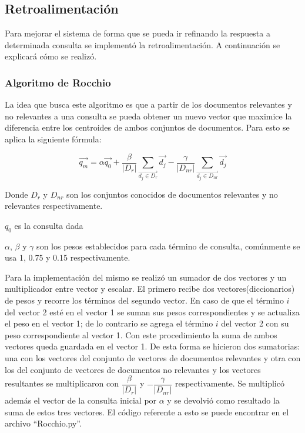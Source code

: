 \documentclass[runningheads]{llncs}
\begin{document}
	\subsection{Retroalimentación}
	Para mejorar el sistema de forma que se pueda ir refinando la respuesta a determinada consulta se implement\'o la retroalimentaci\'on. A continuaci\'on se explicar\'a c\'omo se realiz\'o.
	
	\subsubsection{Algoritmo de Rocchio}
	La idea que busca este algoritmo es que a partir de los documentos relevantes y no relevantes a una consulta se pueda obtener un nuevo vector que maximice la diferencia entre los centroides de ambos conjuntos de documentos.
	Para esto se aplica la siguiente f\'ormula:
	
	$$
	\vec{q_{m}}= \alpha \vec{q_{0}}+\dfrac{\beta}{|D_{r}|}\sum_{\vec{d_{j} \in D_{r}}} \vec{d_{j}} -\dfrac{\gamma}{|D_{nr}|}\sum_{\vec{d_{j} \in D_{nr}}} \vec{d_{j}}
	$$
	
	Donde $ D_{r} $ y $D_{nr} $ son los conjuntos conocidos de documentos relevantes y no relevantes respectivamente.
	
	$ q_{0} $ es la consulta dada
	
	$ \alpha$, $\beta $ y  $ \gamma $ son los pesos establecidos para cada t\'ermino de consulta, com\'unmente se usa 1, 0.75 y 0.15 respectivamente.
	
	Para la implementaci\'on del mismo se realiz\'o un sumador de dos vectores y un multiplicador entre vector y escalar. El primero recibe dos vectores(diccionarios) de pesos y recorre los t\'erminos del segundo vector. En caso de que el t\'ermino $i$ del vector 2 est\'e en el vector 1 se suman sus pesos correspondientes y se actualiza el peso en el vector 1; de lo contrario se agrega el t\'ermino $i$ del vector 2 con su peso correspondiente al vector 1. Con este procedimiento la suma de ambos vectores queda guardada en el vector 1. De esta forma se hicieron dos sumatorias: una con los vectores del conjunto de vectores de documentos relevantes y otra con los del conjunto de vectores de documentos no relevantes y los vectores resultantes se multiplicaron con $ \dfrac{\beta}{|D_{r}|} $ y $-\dfrac{\gamma}{|D_{nr}|} $ respectivamente. Se multiplic\'o adem\'as el vector de la consulta inicial por $ \alpha $ y se devolvi\'o como resultado la suma de estos tres vectores. El c\'odigo referente a esto se puede encontrar en el archivo ``Rocchio.py''.
	
\end{document}
